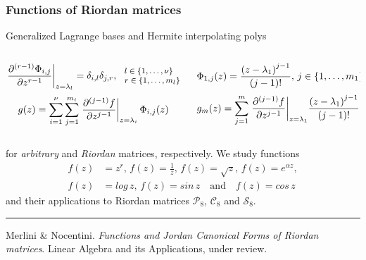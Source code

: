 \documentclass[9pt]{beamer}
\begin{document}
\begin{frame}[fragile]
\frametitle{Functions of Riordan matrices}
Generalized Lagrange bases and Hermite interpolating polys
\begin{columns}
    \begin{column}{0.5\textwidth}
        \begin{displaymath}
        \footnotesize
        \left. \frac{\partial^{(r-1)}{\Phi_{i,j}}}{\partial{z}^{r-1}} \right|_{z=\lambda_{l}} = \delta_{i,l}\delta_{j,r},
        \,
        \begin{array}{l}
            l\in \lbrace 1, \ldots, \nu \rbrace \\
            r \in \lbrace 1, \ldots, m_{l} \rbrace
        \end{array}
        \end{displaymath}
        \begin{displaymath}
        \footnotesize
        g(z) = \sum_{i=1}^{\nu}{\sum_{j=1}^{m_{i}}{ \left.
        \frac{\partial^{(j-1)}{f}}{\partial{z}^{j-1}} \right|_{z=\lambda_{i}}\Phi_{i,j}(z) }}
        \end{displaymath}
    \end{column}
    \vrule{}
    \begin{column}{0.5\textwidth}
        \begin{displaymath}
        \footnotesize
          \Phi_{1,j}(z) = \frac{\left(z-\lambda_{1}\right)^{j-1}}{(j-1)!},
          \, j\in \lbrace 1,\ldots, m_{1} \rbrace
        \end{displaymath}
        \begin{displaymath}
        \footnotesize
        g_{m}(z) = {\sum_{j=1}^{m}{ \left.
        \frac{\partial^{(j-1)}{f}}{\partial{z}^{j-1}} \right|_{z=\lambda_{1}}}}
        \frac{\left(z-\lambda_{1}\right)^{j-1}}{(j-1)!}
        \end{displaymath}
    \end{column}
\end{columns}
for \textit{arbitrary} and \textit{Riordan} matrices, respectively.
We study functions
\begin{displaymath}
\begin{split}
f(z)&=z^{r},\,{f(z)=\frac{1}{z}},\,{f(z)=\sqrt{z}},\,{f(z)=e^{\alpha z}},\\
f(z)&=log\,{z},\,f(z)=sin\,{z}\quad\text{and}\quad f(z)=cos\,{z}
\end{split}
\end{displaymath}
and their applications to Riordan matrices $\mathcal{P}_{8}$, $\mathcal{C}_{8}$
and $\mathcal{S}_{8}$.
\vfill
\noindent\rule{\textwidth}{0.1pt}
{\footnotesize
Merlini \& Nocentini. \textit{Functions and Jordan Canonical Forms of Riordan
matrices}. \newline Linear Algebra and its Applications, under review.}
\end{frame}
\end{document}
